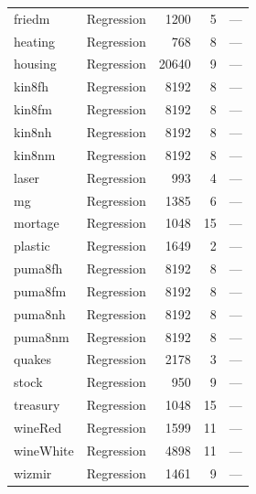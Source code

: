 \begin{table}[ht]
\begin{tabular}{llrrr}
friedm & Regression & 1200 & 5 & --- \\
heating & Regression & 768 & 8 & --- \\
housing & Regression & 20640 & 9 & --- \\
kin8fh & Regression & 8192 & 8 & --- \\
kin8fm & Regression & 8192 & 8 & --- \\
kin8nh & Regression & 8192 & 8 & --- \\
kin8nm & Regression & 8192 & 8 & --- \\
laser & Regression & 993 & 4 & --- \\
mg & Regression & 1385 & 6 & --- \\
mortage & Regression & 1048 & 15 & --- \\
plastic & Regression & 1649 & 2 & --- \\
puma8fh & Regression & 8192 & 8 & --- \\
puma8fm & Regression & 8192 & 8 & --- \\
puma8nh & Regression & 8192 & 8 & --- \\
puma8nm & Regression & 8192 & 8 & --- \\
quakes & Regression & 2178 & 3 & --- \\
stock & Regression & 950 & 9 & --- \\
treasury & Regression & 1048 & 15 & --- \\
wineRed & Regression & 1599 & 11 & --- \\
wineWhite & Regression & 4898 & 11 & --- \\
wizmir & Regression & 1461 & 9 & --- \\
\bottomrule
\end{tabular}
\end{table}
